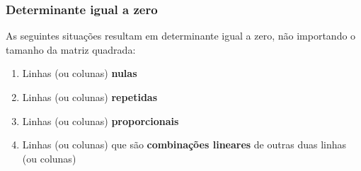 \documentclass[pdftex, brazil]{beamer}
\begin{document}
\begin{frame}[t]
  \frametitle{Determinante igual a zero}
  As seguintes situações resultam em determinante igual a zero, não importando
  o tamanho da matriz quadrada:
    \begin{enumerate}
      \item Linhas (ou colunas) \textbf{nulas}
      \item Linhas (ou colunas) \textbf{repetidas}
      \item Linhas (ou colunas) \textbf{proporcionais}
      \item Linhas (ou colunas) que são \textbf{combinações lineares} de outras
        duas linhas (ou colunas)
    \end{enumerate}
\end{frame}
\end{document}
